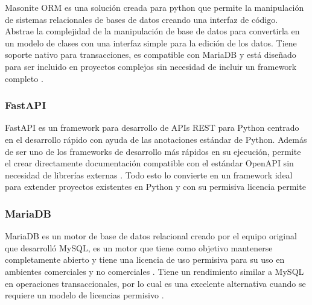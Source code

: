 Masonite ORM es una solución creada para python que permite la manipulación de sistemas relacionales de bases de datos creando una interfaz de código. Abstrae la complejidad de la manipulación de base de datos para convertirla en un modelo de clases con una interfaz simple para la edición de los datos. Tiene soporte nativo para transacciones, es compatible con MariaDB y está diseñado para ser incluido en proyectos complejos sin necesidad de incluir un framework completo \cite{masonite_2021}.

\subsubsection{FastAPI}

FastAPI es un framework para desarrollo de APIs REST para Python centrado en el desarrollo rápido con ayuda de las anotaciones estándar de Python. Además de ser uno de los frameworks de desarrollo más rápidos en su ejecución, permite el crear directamente documentación compatible con el estándar OpenAPI sin necesidad de librerías externas \cite{fastapi_ramirez_2020}. Todo esto lo convierte en un framework ideal para extender proyectos existentes en Python y con su permisiva licencia permite %

\subsubsection{MariaDB}

MariaDB es un motor de base de datos relacional creado por el equipo original que desarrolló MySQL, es un motor que tiene como objetivo mantenerse completamente abierto y tiene una licencia de uso permisiva para su uso en ambientes comerciales y no comerciales \cite{mariadb_foundation_2019}. Tiene un rendimiento similar a MySQL en operaciones transaccionales, por lo cual es una excelente alternativa cuando se requiere un modelo de licencias permisivo \cite{mariadb_comparison}.



